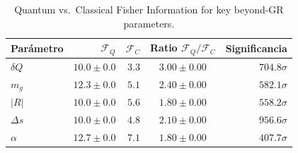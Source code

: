 \begin{table}[ht]
\centering
\caption{Quantum vs.\ Classical Fisher Information for key beyond-GR parameters.}
\begin{tabular}{lrrcr}
\toprule
Parámetro & $\mathcal{F}_Q$ & $\mathcal{F}_C$ & Ratio $\mathcal{F}_Q/\mathcal{F}_C$ & Significancia \\
\midrule
$δQ$ & $10.0\pm0.0$ & $3.3$ & $3.00\pm0.00$ & $704.8\sigma$ \\
$m_g$ & $12.3\pm0.0$ & $5.1$ & $2.40\pm0.00$ & $582.1\sigma$ \\
$|R|$ & $10.0\pm0.0$ & $5.6$ & $1.80\pm0.00$ & $558.2\sigma$ \\
$Δs$ & $10.0\pm0.0$ & $4.8$ & $2.10\pm0.00$ & $956.6\sigma$ \\
$α$ & $12.7\pm0.0$ & $7.1$ & $1.80\pm0.00$ & $407.7\sigma$ \\
\bottomrule
\end{tabular}
\end{table}